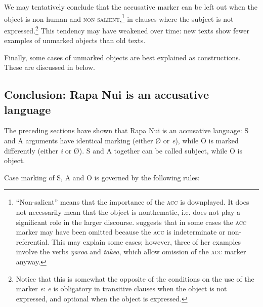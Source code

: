 We may tentatively conclude that the accusative marker can be left out when the object is non-human and \textsc{non-salient},\footnote{\label{fn:410}“Non-salient” means that the importance of the \textsc{acc} is downplayed. It does not necessarily mean that the object is nonthematic, i.e. does not play a significant role in the larger discourse. 
\citet[50]{WeberN2003} suggests that in some cases the \textsc{acc} marker may have been omitted because the \textsc{acc} is indeterminate or non-referential. This may explain some cases; however, three of her examples involve the verbs \textit{ŋaro{\ꞌ}a} and \textit{take{\ꞌ}a}, which allow omission of the \textsc{acc} marker anyway.}  in clauses where the subject is not expressed.\footnote{\label{fn:411}Notice that this is somewhat the opposite of the conditions on the use of the  marker \textit{e}: \textit{e} is obligatory in transitive clauses when the object is not expressed, and optional when the object is expressed.} This tendency may have weakened over time: new texts show fewer examples of unmarked objects than old texts.

Finally, some cases of unmarked objects are best explained as  constructions. These are discussed in  below.

\subsection{Conclusion: Rapa Nui is an accusative language}\label{sec:8.4.2}

The preceding sections have shown that Rapa Nui is an accusative language: S and A arguments have identical marking (either Ø or \textit{e}), while O is marked differently (either \textit{i} or Ø). S and A together can be called subject, while O is object.

Case marking of S, A and O is governed by the following rules:

